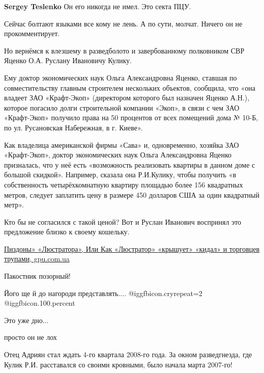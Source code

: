 \begin{itemize}
\begin{itemize} %
\textbf{Sergey Teslenko} Он его никогда не имел. Это секта ПЦУ.
\end{itemize} %


Сейчас болтают языками все кому не лень. А по сути, молчат. Ничего он не
прокомментирует.


Но вернёмся к влезшему в разведболото и завербованному полковником СВР Яценко
О.А. Руслану Ивановичу Кулику.

Ему доктор экономических наук Ольга Александровна Яценко, ставшая по
совместительству главным строителем нескольких объектов, сообщила, что «она
владеет ЗАО «Крафт-Экоп» (директором которого был назначен Яценко А.Н.),
которое погасило долги строительной компании «Экоп», в связи с чем ЗАО
«Крафт-Экоп» получило права на 50 процентов от всех помещений дома № 10-Б, по
ул. Русановская Набережная, в г. Киеве».

Как владелица американской фирмы «Сава» и, одновременно, хозяйка ЗАО
«Крафт-Экоп», доктор экономических наук Ольга Александровна Яценко призналась,
что у неё есть «возможность реализовать квартиры в данном доме с большой
скидкой». Например, сказала она Р.И.Кулику, чтобы получить «в собственность
четырёхкомнатную квартиру площадью более 156 квадратных метров, следует
заплатить цену в размере 450 долларов США за один квадратный метр».

Кто бы не согласился с такой ценой? Вот и Руслан Иванович воспринял это
предложение близко к своему кошельку.

\href{http://gpu.com.ua/content/«pizdony»-«lyustratora»-ili-kak-«lyustrator»-«kryshuet»-«kidal»-i-torgovtsev-trupami-15}{%
Пиздоны» «Люстратора», Или Как «Люстратор» «крышует» «кидал» и торговцев трупами, gpu.com.ua%
}

Пакостник позорный!

Його ще й до нагороди представлять.... @igg{fbicon.cry}{repeat=2}  @igg{fbicon.100.percent} 

Это уже дно...

просто он не лох


Отец Адриян стал ждать 4-го квартала 2008-го года. За окном разведгнезда, где
Кулик Р.И. расставался со своими кровными, было начала марта 2007-го!


\end{itemize}

